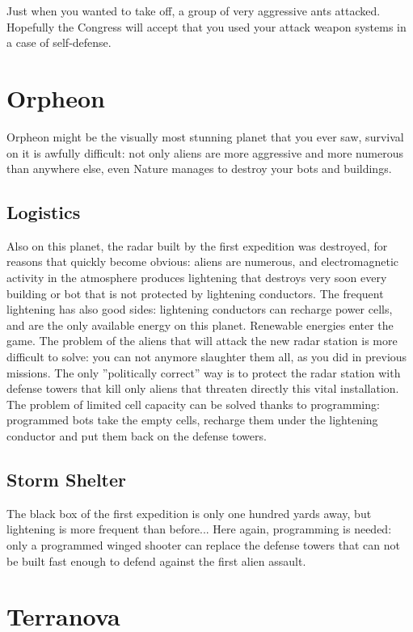 Just when you wanted to take off, a group of very aggressive ants attacked. Hopefully the Congress will accept that you used your attack weapon systems in a case of self-defense.


\newpage
\section{Orpheon}

Orpheon might be the visually most stunning planet that you ever saw, survival on it is awfully difficult: not only aliens are more aggressive and more numerous than anywhere else, even Nature manages to destroy your bots and buildings.


\subsection{Logistics}

Also on this planet, the radar built by the first expedition was destroyed, for reasons that quickly become obvious: aliens are numerous, and electromagnetic activity in the atmosphere produces lightening that destroys very soon every building or bot that is not protected by lightening conductors. The frequent lightening has also good sides: lightening conductors can recharge power cells, and are the only available energy on this planet. Renewable energies enter the game. The problem of the aliens that will attack the new radar station is more difficult to solve: you can not anymore slaughter them all, as you did in previous missions. The only ''politically correct'' way is to protect the radar station with defense towers that kill only aliens that threaten directly this vital installation. The problem of limited cell capacity can be solved thanks to programming: programmed bots take the empty cells, recharge them under the lightening conductor and put them back on the defense towers.


\subsection{Storm Shelter}

The black box of the first expedition is only one hundred yards away, but lightening is more frequent than before... Here again, programming is needed: only a programmed winged shooter can replace the defense towers that can not be built fast enough to defend against the first alien assault.


\newpage
\section{Terranova}

